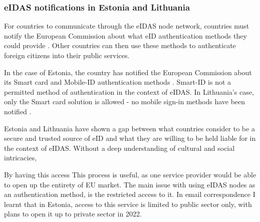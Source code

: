 \subsubsection{eIDAS notifications in Estonia and Lithuania}

For countries to communicate through the eIDAS node network, countries must notify the European Commission about what eID authentication methods they could provide \cite{eulaw-eidas}. Other countries can then use these methods to authenticate foreign citizens into their public services.

In the case of Estonia, the country has notified the European Commission about its Smart card and Mobile-ID authentication methods \cite{eulaw-eidas-notified}. Smart-ID is not a permitted method of authentication in the context of eIDAS. In Lithuania's case, only the Smart card solution is allowed - no mobile sign-in methods have been notified \cite{eulaw-eidas-notified}.

Estonia and Lithuania have shown a gap between what countries consider to be a secure and trusted source of eID and what they are willing to be held liable for in the context of eIDAS. Without a deep understanding of cultural and social intricacies, 

By having this access  This process is useful, as one service provider would be able to open up the entirety of EU market. The main issue with using eIDAS nodes as an authentication method, is the restricted access to it. In email correspondence I learnt that in Estonia, access to this service is limited to public sector only, with plans to open it up to private sector in 2022.






